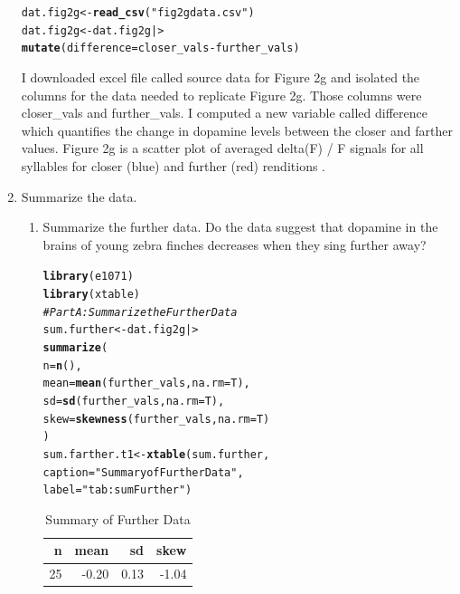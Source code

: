 \documentclass{article}\usepackage[]{graphicx}\usepackage[]{xcolor}
\makeatletter
\newcommand{\hlsng}[1]{\textcolor[rgb]{0.192,0.494,0.8}{#1}}%
\newcommand{\hlcom}[1]{\textcolor[rgb]{0.678,0.584,0.686}{\textit{#1}}}%
\newcommand{\hlopt}[1]{\textcolor[rgb]{0,0,0}{#1}}%
\newcommand{\hldef}[1]{\textcolor[rgb]{0.345,0.345,0.345}{#1}}%
\newcommand{\hlkwb}[1]{\textcolor[rgb]{0.69,0.353,0.396}{#1}}%
\newcommand{\hlkwc}[1]{\textcolor[rgb]{0.333,0.667,0.333}{#1}}%
\newcommand{\hlkwd}[1]{\textcolor[rgb]{0.737,0.353,0.396}{\textbf{#1}}}%
\newenvironment{kframe}{%
 \def\at@end@of@kframe{}%
 \ifinner\ifhmode%
  \def\at@end@of@kframe{\end{minipage}}%
  \begin{minipage}{\columnwidth}%
 \fi\fi%
 \def\FrameCommand##1{\hskip\@totalleftmargin \hskip-\fboxsep
 \colorbox{shadecolor}{##1}\hskip-\fboxsep
     \hskip-\linewidth \hskip-\@totalleftmargin \hskip\columnwidth}%
 \MakeFramed {\advance\hsize-\width
   \@totalleftmargin\z@ \linewidth\hsize
   \@setminipage}}%
 {\par\unskip\endMakeFramed%
 \at@end@of@kframe}
\newenvironment{knitrout}{}{} %
\makeatother
\begin{document}
\begin{enumerate}
\begin{knitrout}
\begin{kframe}
\begin{alltt}
\hldef{dat.fig2g} \hlkwb{<-} \hlkwd{read_csv}\hldef{(}\hlsng{"fig2gdata.csv"}\hldef{)}
\hldef{dat.fig2g} \hlkwb{<-} \hldef{dat.fig2g |>}
  \hlkwd{mutate}\hldef{(}\hlkwc{difference} \hldef{= closer_vals} \hlopt{-} \hldef{further_vals)}
\end{alltt}
\end{kframe}
\end{knitrout}
I downloaded excel file called source data for Figure 2g and isolated the columns for the data needed to replicate Figure 2g. Those columns were closer\_vals and further\_vals. I computed a new variable called difference which quantifies the change in dopamine levels between the closer and farther values. Figure 2g is a scatter plot of averaged delta(F) / F signals for all syllables for closer (blue) and further (red) renditions \citep{Kasdin25}.
\item Summarize the data.
\begin{enumerate}
  \item Summarize the further data. Do the data suggest that
   dopamine in the brains of young zebra finches decreases when
   they sing further away?
\begin{knitrout}
\color{fgcolor}\begin{kframe}
\begin{alltt}
\hlkwd{library}\hldef{(e1071)}
\hlkwd{library}\hldef{(xtable)}
\hlcom{# Part A: Summarize the Further Data}
\hldef{sum.further} \hlkwb{<-} \hldef{dat.fig2g |>}
  \hlkwd{summarize}\hldef{(}
    \hlkwc{n} \hldef{=} \hlkwd{n}\hldef{(),}
    \hlkwc{mean} \hldef{=} \hlkwd{mean}\hldef{(further_vals,} \hlkwc{na.rm} \hldef{= T),}
    \hlkwc{sd} \hldef{=} \hlkwd{sd}\hldef{(further_vals,} \hlkwc{na.rm} \hldef{= T),}
    \hlkwc{skew} \hldef{=} \hlkwd{skewness}\hldef{(further_vals,} \hlkwc{na.rm}\hldef{=T)}
  \hldef{)}
\hldef{sum.farther.t1} \hlkwb{<-} \hlkwd{xtable}\hldef{(sum.further,}
                         \hlkwc{caption} \hldef{=} \hlsng{"Summary of Further Data"}\hldef{,}
                         \hlkwc{label} \hldef{=} \hlsng{"tab:sumFurther"}\hldef{)}
\end{alltt}
\end{kframe}
\end{knitrout}
\begin{table}[H]
\centering
\begingroup\small
\begin{tabular}{rrrr}
  \hline
n & mean & sd & skew \\ 
  \hline
 25 & -0.20 & 0.13 & -1.04 \\ 
   \hline
\end{tabular}
\endgroup
\caption{Summary of Further Data} 
\label{tab:sumFurther}
\end{table}


\end{enumerate}
\end{enumerate}
\end{document}
